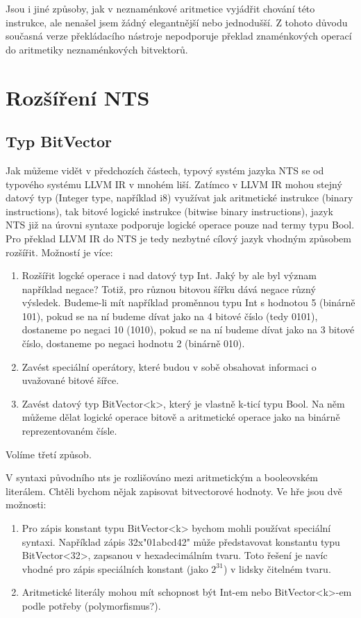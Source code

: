 \documentclass[10pt,a4paper,notitlepage]{report}
\begin{document}
Jsou i jiné způsoby, jak v neznaménkové aritmetice vyjádřit chování této instrukce, ale nenašel jsem žádný elegantnější nebo jednodušší. Z tohoto důvodu současná verze překládacího nástroje nepodporuje překlad znaménkových operací do aritmetiky neznaménkových bitvektorů.


\section{Rozšíření NTS}

\subsection{Typ BitVector}
Jak můžeme vidět v předchozích částech, typový systém jazyka NTS se od typového systému LLVM IR 
v mnohém liší. Zatímco v LLVM IR mohou stejný datový typ (Integer type, například i8) využívat jak aritmetické instrukce (binary instructions), tak bitové logické instrukce (bitwise binary instructions), jazyk NTS již na úrovni syntaxe podporuje logické operace pouze nad termy typu Bool. Pro překlad LLVM IR do NTS je tedy nezbytné cílový jazyk vhodným způsobem rozšířit. Možností je více:
\begin{enumerate}
\item Rozšířit logcké operace i nad datový typ Int. Jaký by ale byl význam například negace? Totiž, pro různou bitovou šířku dává negace různý výsledek. Budeme-li mít například proměnnou typu Int s hodnotou 5 (binárně 101), pokud se na ní budeme dívat jako na 4 bitové číslo (tedy 0101), dostaneme po negaci 10 (1010), pokud se na ní budeme dívat jako na 3 bitové číslo, dostaneme po negaci hodnotu 2 (binárně 010). 

\item Zavést speciální operátory, které budou v sobě obsahovat informaci o uvažované bitové šířce.

\item Zavést datový typ BitVector<k>, který je vlastně k-ticí typu Bool. Na něm můžeme dělat logické operace bitově a aritmetické operace jako na binárně reprezentovaném čísle. 
\end{enumerate}

Volíme třetí způsob.

V syntaxi původního nts je rozlišováno mezi aritmetickým a booleovském literálem. Chtěli bychom nějak zapisovat bitvectorové hodnoty. Ve hře jsou dvě možnosti:

\begin{enumerate}

\item Pro zápis konstant typu BitVector<k> bychom mohli používat speciální syntaxi. Například zápis 32x"01abcd42" může představovat konstantu typu BitVector<32>, zapsanou v hexadecimálním tvaru. Toto řešení je navíc vhodné pro zápis speciálních konstant (jako $2^{31}$) v lidsky čitelném tvaru. 

\item Aritmetické literály mohou mít schopnost být Int-em nebo BitVector<k>-em podle potřeby (polymorfismus?).

\end{enumerate}
\end{document}
